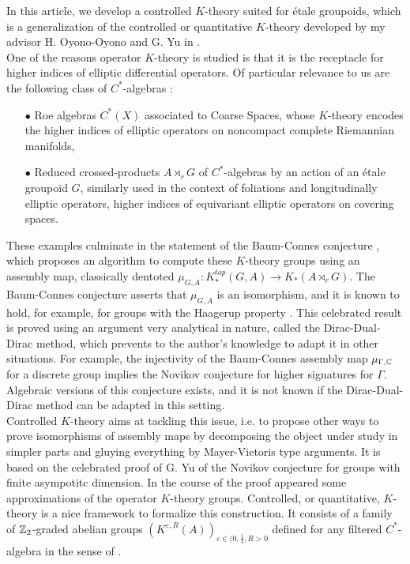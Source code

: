 In this article, we develop a controlled $K$-theory suited for étale groupoids, which is a generalization of the controlled or quantitative $K$-theory developed by my advisor H. Oyono-Oyono and G. Yu in \cite{OY2}. \\

One of the reasons operator $K$-theory is studied is that it is the receptacle for higher indices of elliptic differential operators. Of particular relevance to us are the following class of $C^*$-algebras :
\begin{itemize}
\item[$\bullet$] Roe algebras $C^*(X)$ associated to Coarse Spaces, whose $K$-theory encodes the higher indices of elliptic operators on noncompact complete Riemannian manifolds, 
\item[$\bullet$] Reduced crossed-products $A\rtimes_r G$ of $C^*$-algebras by an action of an étale groupoid $G$, similarly used in the context of foliations and longitudinally elliptic operators, higher indices of equivariant elliptic operators on covering spaces.\\
\end{itemize}

These examples culminate in the statement of the Baum-Connes conjecture \cite{BaumConnesHigson}, which proposes an algorithm to compute these $K$-theory groups using an assembly map, classically dentoted $\mu_{G,A} : K^{top}_*(G,A)\rightarrow K_*(A\rtimes_r G)$. The Baum-Connes conjecture asserts that $\mu_{G,A}$ is an isomorphism, and it is known to hold, for example, for groups with the Haagerup property \cite{HigsonKasparov}. This celebrated result is proved using an argument very analytical in nature, called the Dirac-Dual-Dirac method, which prevents to the author's knowledge to adapt it in other situations. For example, the injectivity of the Baum-Connes assembly map $\mu_{\Gamma,\mathbb C}$ for a discrete group implies the Novikov conjecture for higher signatures for $\Gamma$. Algebraic versions of this conjecture exists, and it is not known if the Dirac-Dual-Dirac method can be adapted in this setting.  \\

Controlled $K$-theory aims at tackling this issue, i.e. to propose other ways to prove isomorphisms of assembly maps by decomposing the object under study in simpler parts and gluying everything by Mayer-Vietoris type arguments. It is based on the celebrated proof of G. Yu \cite{Yu1} of the Novikov conjecture for groups with finite asympotitc dimension. In the course of the proof appeared some approximations of the operator $K$-theory groups. Controlled, or quantitative, $K$-theory is a nice framework to formalize this construction. It consists of a family of $\mathbb Z_2$-graded abelian groups $(K^{\varepsilon, R}(A))_{\varepsilon\in(0,\frac{1}{4},R>0}$ defined for any filtered $C^*$-algebra in the sense of \cite{OY2}. \\

